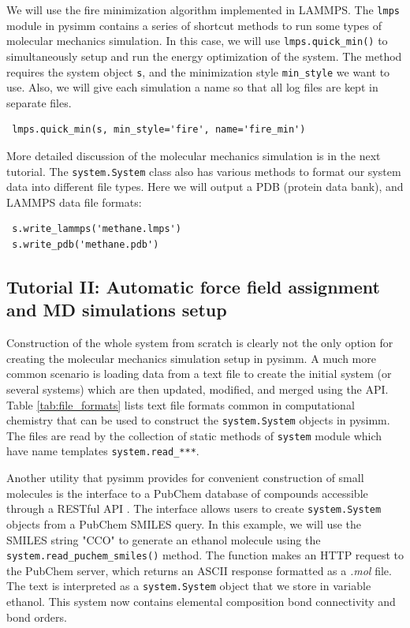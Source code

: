 \documentclass[9pt,tutorial]{livecoms}
\begin{document}
We will use the fire minimization algorithm implemented in LAMMPS. The \lstinline$lmps$ module in pysimm contains a series of shortcut methods to run some types of molecular mechanics simulation. In this case, we will use \lstinline$lmps.quick_min()$ to simultaneously setup and run the energy optimization of the system. The method requires the system object \lstinline$s$, and the minimization style \lstinline$min_style$ we want to use. Also, we will give each simulation a name so that all log files are kept in separate files.

\begin{lstlisting}
 lmps.quick_min(s, min_style='fire', name='fire_min')
\end{lstlisting}
More detailed discussion of the molecular mechanics simulation is in the next tutorial. The \lstinline$system.System$ class also has various methods to format our system data into different file types. Here we will output a PDB (protein data bank), and LAMMPS data file formats:
\begin{lstlisting}
 s.write_lammps('methane.lmps')
 s.write_pdb('methane.pdb')
\end{lstlisting}


\subsection{Tutorial II: Automatic force field assignment and MD simulations setup}

Construction of the whole system from scratch is clearly not the only option for creating the molecular mechanics simulation setup in pysimm. A much more common scenario is loading data from a text file to create the initial system (or several systems) which are then updated, modified, and merged using the API. Table \ref{tab:file_formats} lists text file formats common in computational chemistry that can be used to construct the \lstinline$system.System$ objects in pysimm. The files are read by the collection of static methods of \lstinline$system$ module which have name templates \lstinline$system.read_***$.     

Another utility that pysimm provides for convenient construction of small molecules is the interface to a PubChem database of compounds accessible through a RESTful API \cite{restful}. The interface allows users to create \lstinline$system.System$ objects from a PubChem SMILES query. In this example, we will use the SMILES string "CCO" to generate an ethanol molecule using the \lstinline$system.read_puchem_smiles()$ method. The function makes an HTTP request to the PubChem server, which returns an ASCII response formatted as a \textit{.mol} file. The text is interpreted as a \lstinline$system.System$ object that we store in variable ethanol. This system now contains elemental composition bond connectivity and bond orders.
\end{document}
